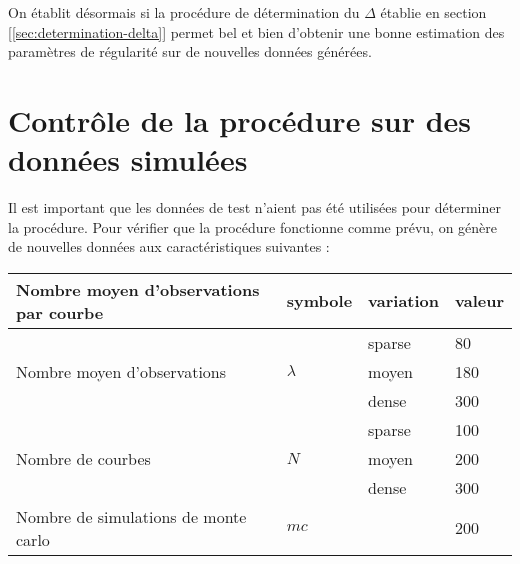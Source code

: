 On établit désormais si la procédure de détermination du $\Delta$ établie en section [\ref{sec:determination-delta}] permet bel et bien d'obtenir une bonne estimation des paramètres de régularité sur de nouvelles données générées.

\section{Contrôle de la procédure sur des données simulées}

Il est important que les données de test n'aient pas été utilisées pour déterminer la procédure. Pour vérifier que la procédure fonctionne comme prévu, on génère de nouvelles données aux caractéristiques suivantes :


\begin{table}[H]
	\centering
	\begin{tabularx}{\textwidth}{XXXX}
		\toprule
		\textbf{Nombre moyen d'observations par courbe}     & \textbf{symbole}                & \textbf{variation} & \textbf{valeur}                                           \\
		\bottomrule
		\multirow{3}{\hsize}{Nombre moyen d'observations}   & \multirow{3}{\hsize}{$\lambda$} & sparse             & 80                                                        \\
		                                                    &                                 & moyen              & 180                                                       \\
		                                                    &                                 & dense              & 300                                                       \\
		\midrule
		\multirow{3}{\hsize}{Nombre de courbes}             & \multirow{3}{\hsize}{$N$}       & sparse             & 100                                                       \\
		                                                    &                                 & moyen              & 200                                                       \\
		                                                    &                                 & dense              & 300                                                       \\
		\midrule
		Nombre de simulations de monte carlo                & $mc$                            &                    & 200                                                       \\

\end{tabularx}
\end{table}
